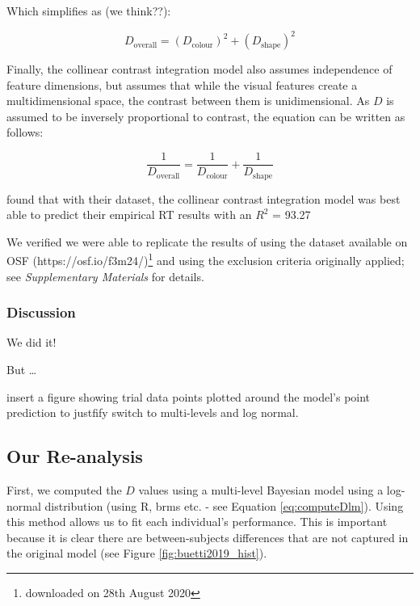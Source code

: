 \documentclass[smallextended]{svjour3}       %
\begin{document}
Which simplifies as (we think??):

\begin{equation}
D_\text{overall} = (D_\text{colour})^2 + (D_\text{shape})^2
\label{eq:orthogonalcontrast2}
\end{equation}

Finally, the collinear contrast integration model also assumes independence of feature dimensions, but assumes that while the visual features create a multidimensional space, the contrast between them is unidimensional. As $D$ is assumed to be inversely proportional to contrast, the equation can be written as follows:

\begin{equation}
\frac{1}{D_\text{overall}} = \frac{1}{D_\text{colour}} + \frac{1}{D_\text{shape}}
\label{eq:collinearcontrast}
\end{equation}

\cite{buetti2019predicting} found that with their dataset, the collinear contrast integration model was best able to predict their empirical RT results with an $R^2$ = 93.27%

We verified we were able to replicate the results of \cite{buetti2019predicting} using the dataset available on OSF (https://osf.io/f3m24/)\footnote{downloaded on 28th August 2020} and using the exclusion criteria originally applied; see \textit{Supplementary Materials} for details.

\subsubsection{Discussion}

We did it! 

But \ldots 

insert  a figure showing trial data points plotted around the model's point prediction to justfify switch to multi-levels and log normal. 


\subsection{Our Re-analysis}

First, we computed the $D$ values using a multi-level Bayesian model using a log-normal distribution (using R, brms etc. - see Equation \ref{eq:computeDlm}). Using this method allows us to fit each individual's performance. This is important because it is clear there are between-subjects differences that are not captured in the original model (see Figure \ref{fig:buetti2019_hist}). 
\end{document}
